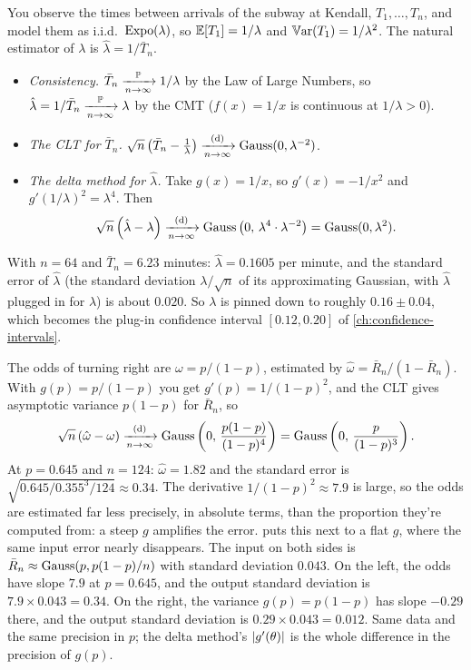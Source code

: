 \begin{worked}
You observe the times between arrivals of the subway at Kendall, $T_1, \ldots, T_n$, and model them as i.i.d.\ $\text{Expo}(\lambda)$, so $\operatorname*{\mathbb{E}}[T_1] = 1/\lambda$ and $\operatorname*{\mathbb{V}\text{ar}}(T_1) = 1/\lambda^2$.
The natural estimator of $\lambda$ is $\hat{\lambda} = 1/\bar{T}_n$.
\begin{itemize}[nosep]
\item \textit{Consistency.} $\bar{T}_n \xrightarrow [n \to \infty ]{\mathbb{P}} 1/\lambda$ by the Law of Large Numbers, so $\hat{\lambda} = 1/\bar{T}_n \xrightarrow [n \to \infty ]{\mathbb{P}} \lambda$ by the CMT ($f(x) = 1/x$ is continuous at $1/\lambda > 0$).
\item \textit{The CLT for $\bar{T}_n$.} $\sqrt{n} \left( \bar{T}_n - \frac{1}{\lambda} \right) \xrightarrow [n \to \infty ]{\text{(d)}} \text{Gauss}(0, \lambda^{-2})$.
\item \textit{The delta method for $\hat{\lambda}$.} Take $g(x) = 1/x$, so $g'(x) = -1/x^2$ and $g'(1/\lambda)^2 = \lambda^4$. Then
\[
\sqrt{n} \left( \hat{\lambda} - \lambda \right) \xrightarrow [n \to \infty ]{\text{(d)}} \text{Gauss} \left( 0, \, \lambda^4 \cdot \lambda^{-2} \right) = \text{Gauss}(0, \lambda^2).
\]
\end{itemize}
With $n = 64$ and $\bar{T}_n = 6.23$ minutes: $\hat{\lambda} = 0.1605$ per minute, and the standard error of $\hat{\lambda}$ (the standard deviation $\lambda/\sqrt{n}$ of its approximating Gaussian, with $\hat{\lambda}$ plugged in for $\lambda$) is about $0.020$.
So $\lambda$ is pinned down to roughly $0.16 \pm 0.04$, which becomes the plug-in confidence interval $[0.12, 0.20]$ of \cref{ch:confidence-intervals}.
\end{worked}

\begin{worked}
The odds of turning right are $\omega = p/(1-p)$, estimated by $\hat{\omega} = \bar{R}_n/(1 - \bar{R}_n)$.
With $g(p) = p/(1-p)$ you get $g'(p) = 1/(1-p)^2$, and the CLT gives asymptotic variance $p(1-p)$ for $\bar{R}_n$, so
\[
\sqrt{n} \left( \hat{\omega} - \omega \right) \xrightarrow [n \to \infty ]{\text{(d)}} \text{Gauss} \left( 0, \, \frac{p(1-p)}{(1-p)^4} \right) = \text{Gauss} \left( 0, \, \frac{p}{(1-p)^3} \right).
\]
At $p = 0.645$ and $n = 124$: $\hat{\omega} = 1.82$ and the standard error is $\sqrt{0.645/0.355^3/124} \approx 0.34$.
The derivative $1/(1-p)^2 \approx 7.9$ is large, so the odds are estimated far less precisely, in absolute terms, than the proportion they're computed from: a steep $g$ amplifies the error.
 puts this next to a flat $g$, where the same input error nearly disappears.
The input on both sides is $\bar{R}_n \approx \text{Gauss}(p, p(1-p)/n)$ with standard deviation $0.043$.
On the left, the odds have slope $7.9$ at $p = 0.645$, and the output standard deviation is $7.9 \times 0.043 = 0.34$.
On the right, the variance $g(p) = p(1-p)$ has slope $-0.29$ there, and the output standard deviation is $0.29 \times 0.043 = 0.012$.
Same data and the same precision in $p$; the delta method's $\lvert g'(\theta)\rvert$ is the whole difference in the precision of $g(p)$.
\end{worked}

